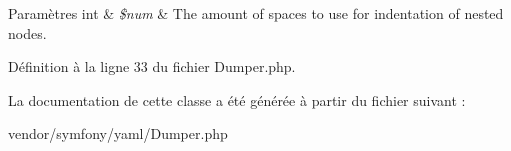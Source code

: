 \begin{DoxyParams}[1]{Paramètres}
int & {\em \$num} & The amount of spaces to use for indentation of nested nodes. \\
\hline
\end{DoxyParams}


Définition à la ligne 33 du fichier Dumper.\+php.



La documentation de cette classe a été générée à partir du fichier suivant \+:\begin{DoxyCompactItemize}
\item 
vendor/symfony/yaml/Dumper.\+php\end{DoxyCompactItemize}
